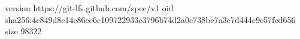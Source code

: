 version https://git-lfs.github.com/spec/v1
oid sha256:4c849d8c14e86ee6c109722933c3796b74d2a0c738be7a3c7d444c9e57fcd656
size 98322
